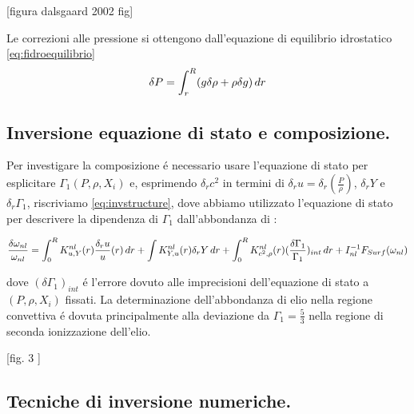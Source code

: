 \documentclass[../main.tex]{subfiles}
\begin{document}
[figura dalsgaard 2002 fig]


Le correzioni alle pressione si ottengono dall'equazione di equilibrio idrostatico \eqref{eq:fidroequilibrio}
\begin{equation}
\delta P=\int_r^R(g\delta \rho+\rho\delta g)\,dr\label{eq:pressurecorrho}
\end{equation}


\subsection{Inversione equazione di stato e composizione.}

Per investigare la composizione \'e necessario usare l'equazione di stato per esplicitare $\Gamma_1(P,\rho,X_i)$ e, esprimendo $\delta_rc^2$ in termini di $\delta_ru=\delta_r(\frac{P}{\rho})$, $\delta_rY$ e $\delta_r\Gamma_1$, riscriviamo \eqref{eq:invstructure}, dove abbiamo utilizzato l'equazione di stato per descrivere la dipendenza di $\Gamma_1$ dall'abbondanza di :

\begin{equation}
\frac{\delta\omega_{nl}}{\omega_{nl}}=\int_0^RK^{nl}_{u,Y}(r)\frac{\delta_ru}{u}(r)\,dr+\int K^{nl}_{Y,u}(r)\delta_rY\,dr+\int_0^RK^{nl}_{c^2,\rho}(r)(\frac{\delta\Gamma_1}{\Gamma_1})_{int}\,dr+I_{nl}^{-1}F_{Surf}(\omega_{nl})\label{eq:diffthermo}
\end{equation}

dove $(\delta\Gamma_1)_{int}$ \'e l'errore dovuto alle imprecisioni dell'equazione di stato a $(P,\rho,X_i)$ fissati. La determinazione dell'abbondanza di elio nella regione convettiva \'e dovuta principalmente alla deviazione da $\Gamma_1=\frac{5}{3}$ nella regione di seconda ionizzazione dell'elio.


[fig. 3 \cite{cas99helioseismology}]

\subsection{Tecniche di inversione numeriche.}
\end{document}
